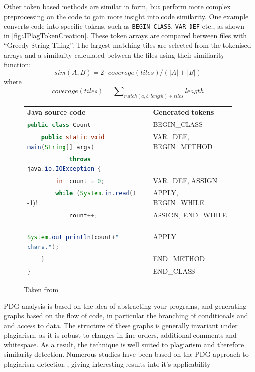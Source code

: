 Other token based methods are similar in form, but perform
more complex preprocessing on the code to gain more insight into code similarity.
One example converts code into specific tokens, such as \texttt{BEGIN\_CLASS}, \texttt{VAR\_DEF}
etc., as shown in \cref{fig:JPlagTokenCreation}. These token arrays are 
compared between files with ``Greedy String Tiling''\cite{GreedyStringTiling}.
The largest matching tiles are selected from the tokenised arrays and a similarity
calculated between the files using their similiarity function:
\[sim(A,B) = 2 \cdot
coverage(tiles)/(|A| + |B|)\] where \[coverage(tiles) =
\sum\nolimits_{match(a,b,length) \in tiles}length\]
\cite{JPlag}

\begin{figure}[H]
\begin{tabular}{l l}
\textbf{Java source code} & \textbf{Generated tokens} \\
\lstinline[language=Java]!public class Count! & BEGIN\_CLASS \\
\lstinline[language=Java]!    public static void main(String[] args)! & VAR\_DEF, BEGIN\_METHOD \\
\lstinline[language=Java]!            throws java.io.IOException {! \\
\lstinline[language=Java]!        int count = 0;! & VAR\_DEF, ASSIGN \\
\lstinline[language=Java]!        while (System.in.read() != -1)! & APPLY, BEGIN\_WHILE \\
\lstinline[language=Java]!            count++;! & ASSIGN, END\_WHILE \\
\lstinline[language=Java]!        System.out.println(count+" chars.");! & APPLY \\
\lstinline[language=Java]!    }! & END\_METHOD \\
\lstinline[language=Java]!}! & END\_CLASS \\
\end{tabular}
\caption{Taken from \citep[p.~1020]{JPlag}}
\end{figure}
\label{fig:JPlagTokenCreation}


PDG analysis is based on the idea of abstracting your programs, and generating
graphs based on the flow of code, in particular the branching of conditionals
and and access to data\cite{PDGOptimisation}. The structure of these graphs
is generally invariant under plagiarism, as it is robust to changes in line
orders, additional comments and whitespace\cite{GPLAG}. As a result, the technique is well
suited to plagiarism and therefore similarity detection. Numerous studies have been based
on the PDG approach to plagiarism detection\cite{GPLAG} \cite{pdg plag2}, giving
interesting results into it's applicability 

